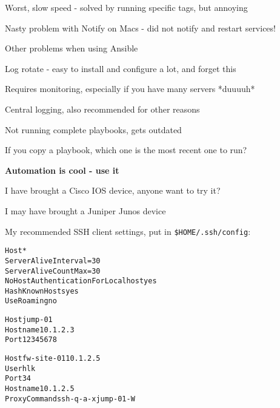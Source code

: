 \documentclass[18pt,landscape,a4paper,footrule]{foils}
\begin{document}
\begin{list2}
\item Worst, slow speed - solved by running specific tags, but annoying
\item Nasty problem with Notify on Macs - did not notify and restart services!
\end{list2}


Other problems when using Ansible

\begin{list2}
\item Log rotate - easy to install and configure a lot, and forget this
\item Requires monitoring, especially if you have many servers *duuuuh*
\item Central logging, also recommended for other reasons
\item Not running complete playbooks, gets outdated
\item If you copy a playbook, which one is the most recent one to run?
\end{list2}



\begin{center}
\vskip 5mm
{\color{titlecolor}\LARGE \bf Automation is cool - use it}
\vskip 5mm

\end{center}



I have brought a Cisco IOS device, anyone want to try it?\\

I may have brought a Juniper Junos device\\


My recommended SSH client settings, put in \verb+$HOME/.ssh/config+:
\begin{alltt}\footnotesize
Host *
    ServerAliveInterval=30
    ServerAliveCountMax=30
    NoHostAuthenticationForLocalhost yes
    HashKnownHosts yes
    UseRoaming no

Host jump-01
  Hostname 10.1.2.3
  Port 12345678

Host fw-site-01 10.1.2.5
  User hlk
  Port 34
  Hostname 10.1.2.5
  ProxyCommand ssh -q -a -x jump-01 -W %h:%p
\end{alltt}
\end{document}
